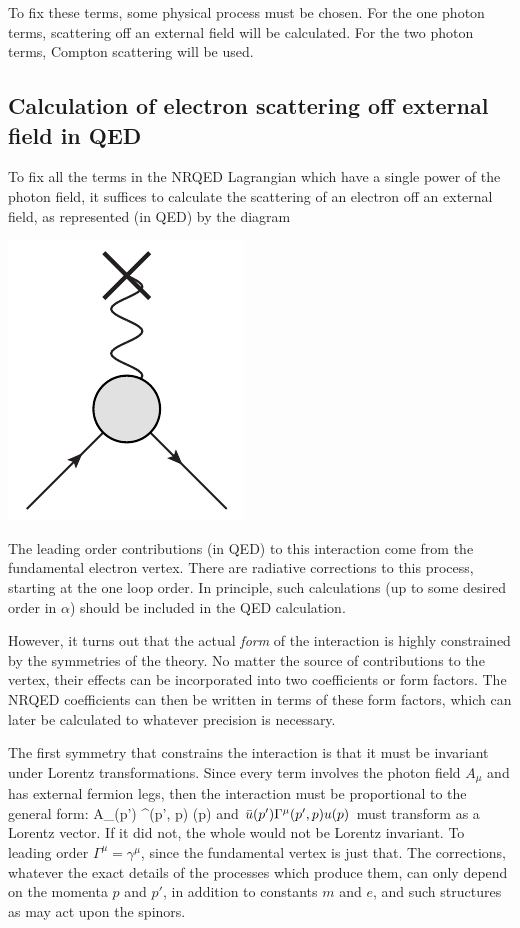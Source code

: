To fix these terms, some physical process must be chosen.  For the one photon terms, scattering off an external field will be calculated.  For the two photon terms, Compton scattering will be used.

\subsection{Calculation of electron scattering off external field in QED}
To fix all the terms in the NRQED Lagrangian which have a single power of the photon field, it suffices to calculate the scattering of an electron off an external field, as represented (in QED) by the diagram

   \includegraphics[scale=0.8]{eps/blob-wave} 


The leading order contributions (in QED) to this interaction come from the fundamental electron vertex.  There are radiative corrections to this process, starting at the one loop order.  In principle, such calculations (up to some desired order in $\alpha$) should be included in the QED calculation.  

However, it turns out that the actual {\it form} of the interaction is highly constrained by the symmetries of the theory.  No matter the source of contributions to the vertex, their effects can be incorporated into two coefficients or form factors.  The NRQED coefficients can then be written in terms of these form factors, which can later be calculated to whatever precision is necessary.  

The first symmetry that constrains the interaction is that it must be invariant under Lorentz transformations.  Since every term involves the photon field $A_\mu$ and has external fermion legs, then the interaction must be proportional to the general form:
\beq
	A_\mu \srb(p') \Gamma^\mu(p', p) \sr(p) 
\eeq 	
and $\bar{u}(p') \Gamma^\mu(p', p) u(p) $ must transform as a Lorentz vector.  If it did not, the whole would not be Lorentz invariant.  To leading order $\Gamma^\mu = \gamma^\mu$, since the fundamental vertex is just that.  The corrections, whatever the exact details of the processes which produce them, can only depend on the momenta $p$ and $p'$, in addition to constants $m$ and $e$, and such structures as may act upon the spinors.

